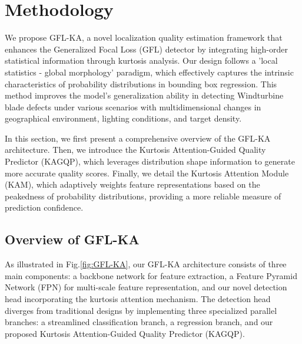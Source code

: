 \section{Methodology}


We propose GFL-KA, a novel localization quality estimation framework that enhances the Generalized Focal Loss (GFL) detector by integrating high-order statistical information through kurtosis analysis. Our design follows a 'local statistics - global morphology' paradigm, which effectively captures the intrinsic characteristics of probability distributions in bounding box regression. This method improves the model's generalization ability in detecting Windturbine blade defects under various scenarios with multidimensional changes in geographical environment, lighting conditions, and target density.

In this section, we first present a comprehensive overview of the GFL-KA architecture. Then, we introduce the Kurtosis Attention-Guided Quality Predictor (KAGQP), which leverages distribution shape information to generate more accurate quality scores. Finally, we detail the Kurtosis Attention Module (KAM), which adaptively weights feature representations based on the peakedness of probability distributions, providing a more reliable measure of prediction confidence.

\subsection{Overview of GFL-KA }


As illustrated in Fig.\ref{fig:GFL-KA}, our GFL-KA architecture consists of three main components: a backbone network for feature extraction, a Feature Pyramid Network (FPN) for multi-scale feature representation, and our novel detection head incorporating the kurtosis attention mechanism. The detection head diverges from traditional designs by implementing three specialized parallel branches: a streamlined classification branch, a regression branch, and our proposed Kurtosis Attention-Guided Quality Predictor (KAGQP).

